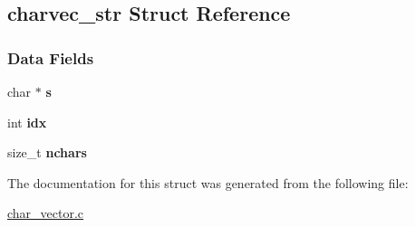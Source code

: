 \hypertarget{structcharvec__str}{}\subsection{charvec\+\_\+str Struct Reference}
\label{structcharvec__str}
\subsubsection*{Data Fields}
\begin{DoxyCompactItemize}
\item 
\mbox{\label{structcharvec__str_a2e5a68044c404f8233b605d389a039d3}} 
char $\ast$ {\bfseries s}
\item 
\mbox{\label{structcharvec__str_a17da05921a5a11552fd8b497ab4409e8}} 
int {\bfseries idx}
\item 
\mbox{\label{structcharvec__str_a9e5b2938db69831e75efda88128ea233}} 
size\+\_\+t {\bfseries nchars}
\end{DoxyCompactItemize}


The documentation for this struct was generated from the following file\+:\begin{DoxyCompactItemize}
\item 
\hyperlink{char__vector_8c}{char\+\_\+vector.\+c}\end{DoxyCompactItemize}
